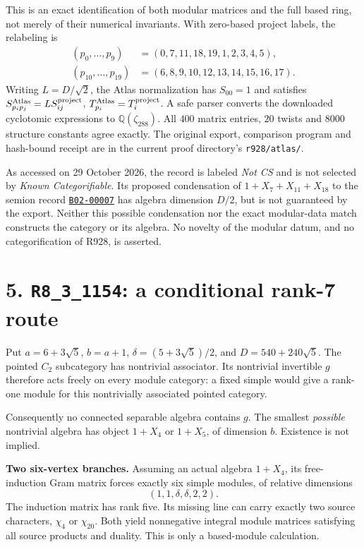 \documentclass[11pt,a4paper]{article}
\newcommand{\R}[1]{\texttt{#1}}
\begin{document}
This is an exact identification of both modular matrices and the full
based ring, not merely of their numerical invariants. With zero-based
project labels, the relabeling is
\[
\begin{aligned}
(p_0,\ldots,p_9)&=(0,7,11,18,19,1,2,3,4,5),\\
(p_{10},\ldots,p_{19})&=(6,8,9,10,12,13,14,15,16,17).
\end{aligned}
\]
Writing $L=D/\sqrt2$, the Atlas normalization has $S_{00}=1$ and
satisfies $S^{\rm Atlas}_{p_i p_j}=L S^{\rm project}_{ij}$,
$T^{\rm Atlas}_{p_i}=T^{\rm project}_i$. A safe parser converts the
downloaded cyclotomic expressions to $\mathbb Q(\zeta_{288})$.
All $400$ matrix entries, $20$ twists and $8000$ structure constants
agree exactly. The original export, comparison program and hash-bound
receipt are in the current proof directory's \texttt{r928/atlas/}.

As accessed on 29 October 2026, the record is labeled \emph{Not CS}
and is not selected by \emph{Known Categorifiable}. Its proposed
condensation of $1+X_7+X_{11}+X_{18}$ to the semion record
\href{https://anyonatlas.org/data/B02-00007}{\texttt{B02-00007}}
has algebra dimension $D/2$, but is not guaranteed by the export.
Neither this possible condensation nor the exact modular-data match
constructs the category or its algebra. No novelty of the modular
datum, and no categorification of R928, is asserted.

\newpage
\section*{5. \R{R8\_3\_1154}: a conditional rank-7 route}
Put $a=6+3\sqrt5$, $b=a+1$, $\delta=(5+3\sqrt5)/2$, and $D=540+240\sqrt5$. The pointed $C_2$ subcategory has nontrivial associator. Its nontrivial invertible $g$ therefore acts freely on every module category: a fixed simple would give a rank-one module for this nontrivially associated pointed category.

Consequently no connected separable algebra contains $g$. The smallest \emph{possible} nontrivial algebra has object $1+X_4$ or $1+X_5$, of dimension $b$. Existence is not implied.

\textbf{Two six-vertex branches.} Assuming an actual algebra $1+X_4$, its free-induction Gram matrix forces exactly six simple modules, of relative dimensions
\[
(1,1,\delta,\delta,2,2).
\]
The induction matrix has rank five. Its missing line can carry exactly two source characters, $\chi_4$ or $\chi_{20}$. Both yield nonnegative integral module matrices satisfying all source products and duality. This is only a based-module calculation.
\end{document}
